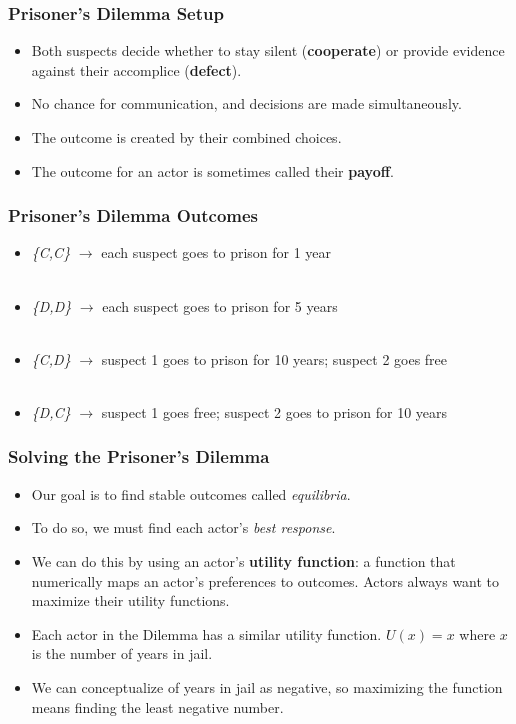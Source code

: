 \documentclass{beamer}
\begin{document}
\begin{frame} 
	\frametitle{\LARGE{Prisoner's Dilemma Setup}}
	\begin{itemize}
	\item Both suspects decide whether to stay silent (\textbf{cooperate}) or provide evidence against their accomplice (\textbf{defect}). \pause
	\item No chance for communication, and decisions are made simultaneously. \pause
	\item The outcome is created by their combined choices. \pause
	\item The outcome for an actor is sometimes called their \textbf{payoff}.
	\end{itemize}
\end{frame}


 \begin{frame} 
 \frametitle{\LARGE{Prisoner's Dilemma Outcomes}}
 	\begin{itemize}
 		\item \emph{\{C,C\}} $\rightarrow$ \pause each suspect goes to prison for 1 year \pause \\~\\
 		\item \emph{\{D,D\}} $\rightarrow$ \pause each suspect goes to prison for 5 years \pause \\~\\
 		\item \emph{\{C,D\}} $\rightarrow$ \pause suspect 1 goes to prison for 10 years; suspect 2 goes free  \pause \\~\\ 
 		\item \emph{\{D,C\}} $\rightarrow$ \pause suspect 1 goes free; suspect 2 goes to prison for 10 years
 	\end{itemize}
 \end{frame}

 \begin{frame} 
 \frametitle{\LARGE{Solving the Prisoner's Dilemma}}
 	\begin{itemize}
 		\item Our goal is to find stable outcomes called \emph{equilibria}. \pause
 		\item To do so, we must find each actor's \emph{best response}. \pause
 		\item We can do this by using an actor's \textbf{utility function}: a function that numerically maps an actor's preferences to outcomes. Actors always want to maximize their utility functions. \pause
 		\item Each actor in the Dilemma has a similar utility function. $U(x)=x$ where $x$ is the number of years in jail. \pause
 		\item We can conceptualize of years in jail as negative, so maximizing the function means finding the least negative number.
 	\end{itemize}
 \end{frame}
\end{document}
